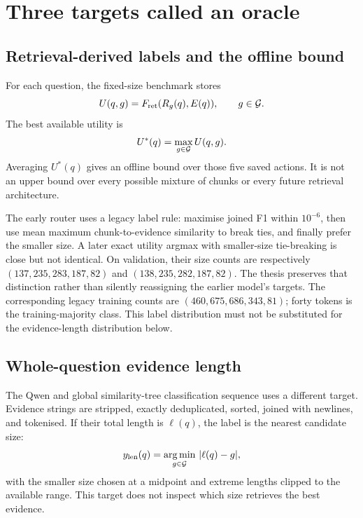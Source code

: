 \section{Three targets called an oracle}
\label{sec:oracles}
\subsection{Retrieval-derived labels and the offline bound}
For each question, the fixed-size benchmark stores
\begin{equation}
U(q,g)=F_{\mathrm{ret}}(R_g(q),E(q)),\qquad g\in\mathcal{G}.
\end{equation}
The best available utility is
\begin{equation}
U^*(q)=\max_{g\in\mathcal{G}}U(q,g).
\label{eq:oracle}
\end{equation}
Averaging $U^*(q)$ gives an offline bound over those five saved actions.
It is not an upper bound over every possible mixture of chunks or every
future retrieval architecture.

The early router uses a legacy label rule: maximise joined F1 within
$10^{-6}$, then use mean maximum chunk-to-evidence similarity to break
ties, and finally prefer
the smaller size. A later exact utility argmax with smaller-size
tie-breaking is close but not identical. On validation, their size
counts are respectively $(137,235,283,187,82)$ and
$(138,235,282,187,82)$. The thesis preserves that distinction rather
than silently reassigning the earlier model's targets. The corresponding
legacy training counts are $(460,675,686,343,81)$; forty tokens is the
training-majority class. This label distribution must not be substituted
for the evidence-length distribution below.

\subsection{Whole-question evidence length}
The Qwen and global similarity-tree classification sequence uses a
different target. Evidence strings are stripped, exactly deduplicated,
sorted, joined with newlines, and tokenised. If their total length is
$\ell(q)$, the label is the nearest candidate size:
\begin{equation}
y_{\mathrm{len}}(q)=
\underset{g\in\mathcal{G}}{\arg\min}\ |\ell(q)-g|,
\label{eq:lengthlabel}
\end{equation}
with the smaller size chosen at a midpoint and extreme lengths clipped
to the available range. This target does not inspect which size
retrieves the best evidence.

